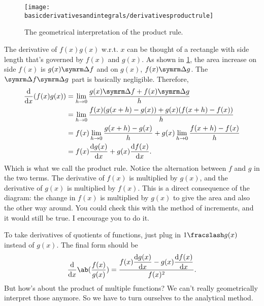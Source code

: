 \begin{figure}[h]
    \centering
    \texttt{[image: basicderivativesandintegrals/derivativesproductrule]}
    \caption{The geometrical interpretation of the product rule.}
    \label{fig:derivativesproductrule}
\end{figure}
The derivative of $f(x)g(x)$ w.r.t. $x$ can be thought of a rectangle with side length that's governed by $f(x)$ and $g(x)$. As shown in \cref{fig:derivativesproductrule}, the area increase on side $f(x)$ is $g(x)\Dd{f}$ and on $g(x)$, $f(x)\Dd{g}$. The $\Dd{f}\Dd{g}$ part is basically negligible. Therefore,
\begin{align*}
    \odv*{(f(x)g(x))}{x} &= \lim_{h \appr 0}\frac{g(x)\Dd{f} + f(x)\Dd{g}}{h} \\
    &= \lim_{h \appr 0}\frac{f(x)(g(x + h) - g(x)) + g(x)(f(x + h) - f(x))}{h} \\
    &= f(x)\lim_{h \appr 0}\frac{g(x + h) - g(x)}{h} + g(x)\lim_{h \appr 0}\frac{f(x + h) - f(x)}{h} \\
    &= f(x)\odv{g(x)}{x} + g(x)\odv{f(x)}{x}.
\end{align*}
Which is what we call the product rule. Notice the alternation between $f$ and $g$ in the two terms. The derivative of $f(x)$ is multiplied by $g(x)$, and the derivative of $g(x)$ is multiplied by $f(x)$. This is a direct consequence of the diagram: the change in $f(x)$ is multiplied by $g(x)$ to give the area and also the other way around. You could check this with the method of increments, and it would still be true. I encourage you to do it.

To take derivatives of quotients of functions, just plug in $\flatfrac{1}{g(x)}$ instead of $g(x)$. The final form should be
\begin{equation}
    \odv*{\ab(\frac{f(x)}{g(x)})}{x} = \frac{\displaystyle f(x)\odv{g(x)}{x} - g(x)\odv{f(x)}{x}}{f(x)^2}.
\end{equation}
But how's about the product of multiple functions? We can't really geometrically interpret those anymore. So we have to turn ourselves to the analytical method.

